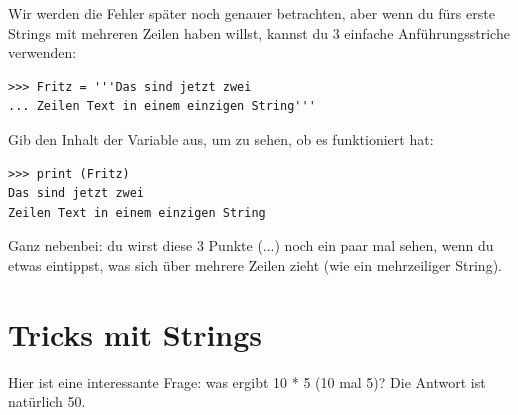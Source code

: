 Wir werden die Fehler später noch genauer betrachten, aber wenn du fürs erste Strings mit mehreren Zeilen haben willst, kannst du 3 einfache Anführungsstriche verwenden:

\begin{Verbatim}[frame=single]
>>> Fritz = '''Das sind jetzt zwei
... Zeilen Text in einem einzigen String'''
\end{Verbatim}

\noindent
Gib den Inhalt der Variable aus, um zu sehen, ob es funktioniert hat:

\begin{Verbatim}[frame=single]
>>> print (Fritz)
Das sind jetzt zwei
Zeilen Text in einem einzigen String
\end{Verbatim}

Ganz nebenbei: du wirst diese 3 Punkte (...) noch ein paar mal sehen, wenn du etwas eintippst, was sich über mehrere Zeilen zieht (wie ein mehrzeiliger String).

\section{Tricks mit Strings}\label{trickswithstrings}

Hier ist eine interessante Frage: was ergibt 10 * 5 (10 mal 5)? Die Antwort ist natürlich 50.

